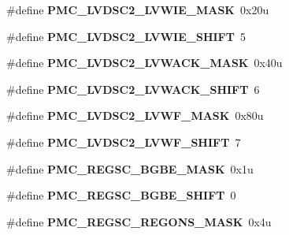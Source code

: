 \begin{DoxyCompactItemize}
\#define {\bfseries P\+M\+C\+\_\+\+L\+V\+D\+S\+C2\+\_\+\+L\+V\+W\+I\+E\+\_\+\+M\+A\+SK}~0x20u
\item 
\mbox{\label{group___p_m_c___register___masks_gaf5cb9cf53bade8254aa7749b5eb36eff}} 
\#define {\bfseries P\+M\+C\+\_\+\+L\+V\+D\+S\+C2\+\_\+\+L\+V\+W\+I\+E\+\_\+\+S\+H\+I\+FT}~5
\item 
\mbox{\label{group___p_m_c___register___masks_ga8b0c8bcad4d38e6ff797e9bc3d9db6d7}} 
\#define {\bfseries P\+M\+C\+\_\+\+L\+V\+D\+S\+C2\+\_\+\+L\+V\+W\+A\+C\+K\+\_\+\+M\+A\+SK}~0x40u
\item 
\mbox{\label{group___p_m_c___register___masks_ga99ad1d373a7be7591a7ee3577bed5374}} 
\#define {\bfseries P\+M\+C\+\_\+\+L\+V\+D\+S\+C2\+\_\+\+L\+V\+W\+A\+C\+K\+\_\+\+S\+H\+I\+FT}~6
\item 
\mbox{\label{group___p_m_c___register___masks_ga34187b0598a3e166a457818770a616d4}} 
\#define {\bfseries P\+M\+C\+\_\+\+L\+V\+D\+S\+C2\+\_\+\+L\+V\+W\+F\+\_\+\+M\+A\+SK}~0x80u
\item 
\mbox{\label{group___p_m_c___register___masks_ga8bcfb9fc5fd4a92164b2aa6cdb6db77e}} 
\#define {\bfseries P\+M\+C\+\_\+\+L\+V\+D\+S\+C2\+\_\+\+L\+V\+W\+F\+\_\+\+S\+H\+I\+FT}~7
\item 
\mbox{\label{group___p_m_c___register___masks_ga98cf5c98c133e20fb620faa6ca29d98e}} 
\#define {\bfseries P\+M\+C\+\_\+\+R\+E\+G\+S\+C\+\_\+\+B\+G\+B\+E\+\_\+\+M\+A\+SK}~0x1u
\item 
\mbox{\label{group___p_m_c___register___masks_ga2e23aa8155158c86fc53ccd8baccf24d}} 
\#define {\bfseries P\+M\+C\+\_\+\+R\+E\+G\+S\+C\+\_\+\+B\+G\+B\+E\+\_\+\+S\+H\+I\+FT}~0
\item 
\mbox{\label{group___p_m_c___register___masks_gab830f2c82eef6d0db7caab8ee5689ba6}} 
\#define {\bfseries P\+M\+C\+\_\+\+R\+E\+G\+S\+C\+\_\+\+R\+E\+G\+O\+N\+S\+\_\+\+M\+A\+SK}~0x4u
\item 
\mbox{\label{group___p_m_c___register___masks_ga06b4e6d970f2610a635c92bb1270541d}} 

\end{DoxyCompactItemize}
